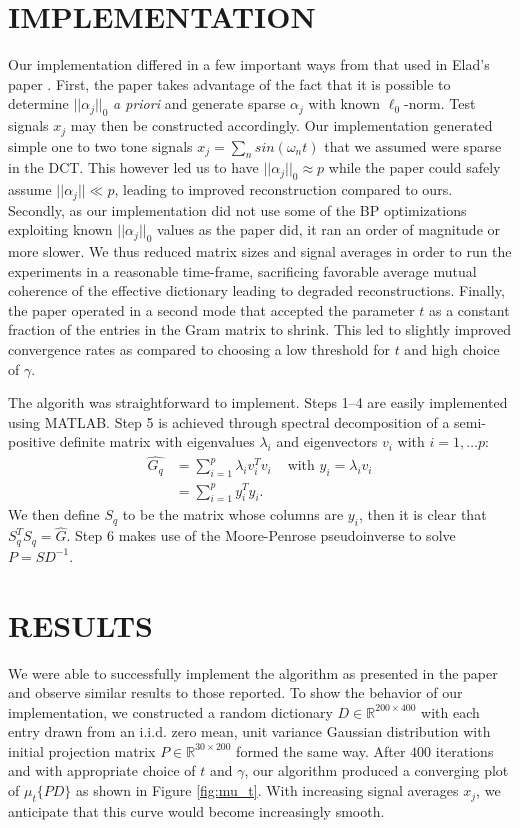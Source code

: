 \documentclass[journal]{IEEEtran}
\begin{document}
\section{IMPLEMENTATION}

Our implementation differed in a few important ways from that used in Elad's paper \cite{elad}.  First, the paper takes advantage of the fact that it is possible to determine $|| \alpha_j ||_0$ \emph{a priori} and generate sparse $\alpha_j$ with known $\ell_0$-norm.  Test signals $x_j$ may then be constructed accordingly.  Our implementation generated simple one to two tone signals $x_j = \sum_n sin(\omega_n t)$ that we assumed were sparse in the DCT.  This however led us to have $||\alpha_j||_0 \approx p$ while the paper could safely assume $ ||\alpha_j|| \ll p$, leading to improved reconstruction compared to ours.  Secondly, as our implementation did not use some of the BP optimizations exploiting known $||\alpha_j||_0$ values as the paper did, it ran an order of magnitude or more slower.  We thus reduced matrix sizes and signal averages in order to run the experiments in a reasonable time-frame, sacrificing favorable average mutual coherence of the effective dictionary leading to degraded reconstructions.  Finally, the paper operated in a second mode that accepted the parameter $t$ as a constant fraction of the entries in the Gram matrix to shrink.  This led to slightly improved convergence rates as compared to choosing a low threshold for $t$ and high choice of $\gamma$.

The algorith was straightforward to implement.  Steps 1--4 are easily implemented using MATLAB.  Step 5 is achieved through spectral decomposition of a semi-positive definite matrix with eigenvalues $\lambda_i$ and eigenvectors $v_i$ with $i = 1, \ldots p$: $$ \begin{aligned} \hat{G_q} &= \sum_{i=1}^p \lambda_i v_i^T v_i & \mbox{ with } y_i = {\lambda_i} v_i \\ &= \sum_{i=1}^p y_i^T y_i.  \end{aligned} $$  We then define $S_q$ to be the matrix whose columns are $y_i$, then it is clear that $S_q^T S_q = \hat{G}$.  Step 6 makes use of the Moore-Penrose pseudoinverse to solve $ P = S D^{-1} $.

\section{RESULTS}

We were able to successfully implement the algorithm as presented in the paper and observe similar results to those reported.  To show the behavior of our implementation, we constructed a random dictionary $D \in \mathbb{R}^{200 \times 400} $ with each entry drawn from an i.i.d. zero mean, unit variance Gaussian distribution with initial projection matrix $P \in \mathbb{R}^{30 \times 200}$ formed the same way.  After $400$ iterations and with appropriate choice of $t$ and $\gamma$, our algorithm produced a converging plot of $\mu_t\{PD\}$ as shown in Figure \ref{fig:mu_t}.  With increasing signal averages $x_j$, we anticipate that this curve would become increasingly smooth.
\end{document}
